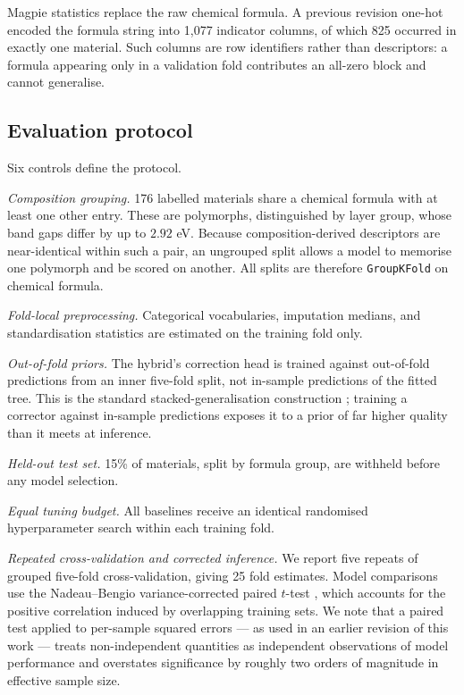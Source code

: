 \documentclass[journal]{IEEEtran}
\begin{document}
Magpie statistics replace the raw chemical formula. A previous revision one-hot
encoded the formula string into 1{,}077 indicator columns, of which 825 occurred
in exactly one material. Such columns are row identifiers rather than
descriptors: a formula appearing only in a validation fold contributes an
all-zero block and cannot generalise.

\subsection{Evaluation protocol}
Six controls define the protocol.

\emph{Composition grouping.} 176 labelled materials share a chemical formula
with at least one other entry. These are polymorphs, distinguished by layer
group, whose band gaps differ by up to $2.92$ eV. Because composition-derived
descriptors are near-identical within such a pair, an ungrouped split allows a
model to memorise one polymorph and be scored on another. All splits are
therefore \texttt{GroupKFold} on chemical formula.

\emph{Fold-local preprocessing.} Categorical vocabularies, imputation medians,
and standardisation statistics are estimated on the training fold only.

\emph{Out-of-fold priors.} The hybrid's correction head is trained against
out-of-fold predictions from an inner five-fold split, not in-sample
predictions of the fitted tree. This is the standard stacked-generalisation
construction \cite{wolpert1992stacked}; training a corrector against in-sample
predictions exposes it to a prior of far higher quality than it meets at
inference.

\emph{Held-out test set.} 15\% of materials, split by formula group, are
withheld before any model selection.

\emph{Equal tuning budget.} All baselines receive an identical randomised
hyperparameter search within each training fold.

\emph{Repeated cross-validation and corrected inference.} We report five repeats
of grouped five-fold cross-validation, giving 25 fold estimates. Model
comparisons use the Nadeau--Bengio variance-corrected paired $t$-test
\cite{nadeau2003inference}, which accounts for the positive correlation induced
by overlapping training sets. We note that a paired test applied to per-sample
squared errors --- as used in an earlier revision of this work --- treats
non-independent quantities as independent observations of model performance and
overstates significance by roughly two orders of magnitude in effective sample
size.
\end{document}
